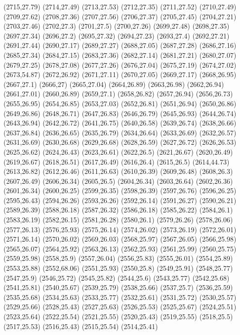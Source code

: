 (2715,27.79)
(2714,27.49)
(2713,27.53)
(2712,27.35)
(2711,27.52)
(2710,27.49)
(2709,27.62)
(2708,27.36)
(2707,27.56)
(2706,27.37)
(2705,27.45)
(2704,27.21)
(2703,27.46)
(2702,27.3)
(2701,27.5)
(2700,27.26)
(2699,27.48)
(2698,27.35)
(2697,27.34)
(2696,27.2)
(2695,27.32)
(2694,27.23)
(2693,27.4)
(2692,27.21)
(2691,27.44)
(2690,27.17)
(2689,27.27)
(2688,27.05)
(2687,27.28)
(2686,27.16)
(2685,27.34)
(2684,27.15)
(2683,27.36)
(2682,27.14)
(2681,27.21)
(2680,27.07)
(2679,27.25)
(2678,27.08)
(2677,27.26)
(2676,27.04)
(2675,27.19)
(2674,27.02)
(2673,54.87)
(2672,26.92)
(2671,27.11)
(2670,27.05)
(2669,27.17)
(2668,26.95)
(2667,27.1)
(2666,27)
(2665,27.04)
(2664,26.89)
(2663,26.98)
(2662,26.94)
(2661,27.01)
(2660,26.89)
(2659,27.1)
(2658,26.82)
(2657,26.94)
(2656,26.73)
(2655,26.95)
(2654,26.85)
(2653,27.03)
(2652,26.81)
(2651,26.94)
(2650,26.86)
(2649,26.86)
(2648,26.71)
(2647,26.83)
(2646,26.79)
(2645,26.93)
(2644,26.74)
(2643,26.94)
(2642,26.72)
(2641,26.75)
(2640,26.58)
(2639,26.74)
(2638,26.66)
(2637,26.84)
(2636,26.65)
(2635,26.79)
(2634,26.64)
(2633,26.69)
(2632,26.57)
(2631,26.69)
(2630,26.68)
(2629,26.68)
(2628,26.59)
(2627,26.72)
(2626,26.53)
(2625,26.62)
(2624,26.43)
(2623,26.61)
(2622,26.5)
(2621,26.67)
(2620,26.49)
(2619,26.67)
(2618,26.51)
(2617,26.49)
(2616,26.4)
(2615,26.5)
(2614,44.73)
(2613,26.82)
(2612,26.46)
(2611,26.63)
(2610,26.39)
(2609,26.48)
(2608,26.3)
(2607,26.49)
(2606,26.34)
(2605,26.5)
(2604,26.34)
(2603,26.64)
(2602,26.36)
(2601,26.34)
(2600,26.25)
(2599,26.35)
(2598,26.39)
(2597,26.76)
(2596,26.25)
(2595,26.43)
(2594,26.26)
(2593,26.26)
(2592,26.14)
(2591,26.27)
(2590,26.21)
(2589,26.39)
(2588,26.18)
(2587,26.32)
(2586,26.18)
(2585,26.22)
(2584,26.1)
(2583,26.19)
(2582,26.15)
(2581,26.28)
(2580,26.1)
(2579,26.26)
(2578,26.06)
(2577,26.13)
(2576,25.93)
(2575,26.14)
(2574,26.02)
(2573,26.19)
(2572,26.01)
(2571,26.14)
(2570,26.02)
(2569,26.03)
(2568,25.97)
(2567,26.05)
(2566,25.98)
(2565,26.07)
(2564,25.92)
(2563,26.13)
(2562,25.93)
(2561,25.99)
(2560,25.75)
(2559,25.98)
(2558,25.9)
(2557,26.04)
(2556,25.83)
(2555,26.01)
(2554,25.89)
(2553,25.88)
(2552,68.06)
(2551,25.93)
(2550,25.8)
(2549,25.91)
(2548,25.77)
(2547,25.9)
(2546,25.72)
(2545,25.82)
(2544,25.6)
(2543,25.77)
(2542,25.68)
(2541,25.81)
(2540,25.67)
(2539,25.79)
(2538,25.66)
(2537,25.7)
(2536,25.59)
(2535,25.68)
(2534,25.63)
(2533,25.77)
(2532,25.61)
(2531,25.72)
(2530,25.57)
(2529,25.66)
(2528,25.43)
(2527,25.63)
(2526,25.53)
(2525,25.67)
(2524,25.51)
(2523,25.64)
(2522,25.54)
(2521,25.55)
(2520,25.43)
(2519,25.55)
(2518,25.5)
(2517,25.53)
(2516,25.43)
(2515,25.54)
(2514,25.41)
